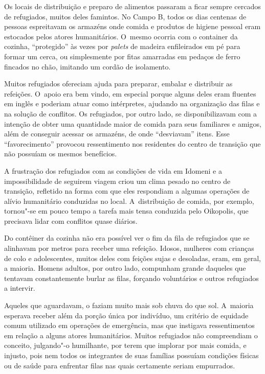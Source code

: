 Os locais de distribuição e preparo de alimentos passaram a ficar sempre
cercados de refugiados, muitos deles famintos. No Campo B, todos os dias
centenas de pessoas espreitavam os armazéns onde comida e produtos de
higiene pessoal eram estocados pelos atores humanitários. O~mesmo
ocorria com o container da cozinha, ``protegido'' às vezes por
\emph{palets} de madeira enfileirados em pé para formar um cerca, ou
simplesmente por fitas amarradas em pedaços de ferro fincados no chão,
imitando um cordão de isolamento.

Muitos refugiados ofereciam ajuda para preparar, embalar e distribuir as
refeições. O~apoio era bem vindo, em especial porque alguns deles eram
fluentes em inglês e poderiam atuar como intérpretes, ajudando na
organização das filas e na solução de conflitos. Os refugiados, por
outro lado, se disponibilizavam com a intenção de obter uma quantidade
maior de comida para seus familiares e amigos, além de conseguir acessar
os armazéns, de onde ``desviavam'' itens. Esse ``favorecimento''
provocou ressentimento nos residentes do centro de transição que não
possuíam os mesmos benefícios.

A frustração dos refugiados com as condições de vida em Idomeni e a
impossibilidade de seguirem viagem criou um clima pesado no centro de
transição, refletido na forma com que eles respondiam a algumas
operações de alívio humanitário conduzidas no local. A~distribuição de
comida, por exemplo, tornou"-se em pouco tempo a tarefa mais tensa
conduzida pelo Oikopolis, que precisava lidar com conflitos quase
diários.

Do contêiner da cozinha não era possível ver o fim da fila de refugiados
que se alinhavam por metros para receber uma refeição. Idosos, mulheres
com crianças de colo e adolescentes, muitos deles com feições sujas e
desoladas, eram, em geral, a maioria. Homens adultos, por outro lado,
compunham grande daqueles que tentavam constantemente burlar as filas,
forçando voluntários e outros refugiados a intervir.

Aqueles que aguardavam, o faziam muito mais sob chuva do que sol.
A~maioria esperava receber além da porção única por indivíduo, um
critério de equidade comum utilizado em operações de emergência, mas que
instigava ressentimentos em relação a alguns atores humanitários. Muitos
refugiados não compreendiam o conceito, julgando"-o humilhante, por terem
que implorar por mais comida, e injusto, pois nem todos os integrantes de
suas famílias possuíam condições físicas ou de saúde para enfrentar
filas nas quais certamente seriam empurrados.

